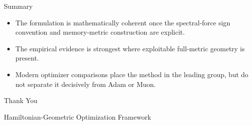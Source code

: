\documentclass[aspectratio=169,11pt]{beamer}
\begin{document}
\begin{frame}{Summary}
  \begin{itemize}
    \item The formulation is mathematically coherent once the spectral-force sign convention and memory-metric construction are explicit.
    \item The empirical evidence is strongest where exploitable full-metric geometry is present.
    \item Modern optimizer comparisons place the method in the leading group, but do not separate it decisively from Adam or Muon.
  \end{itemize}
\end{frame}

\begin{frame}
  \centering
  \Huge Thank You

  \vspace{1em}
  \large Hamiltonian-Geometric Optimization Framework
\end{frame}
\end{document}
